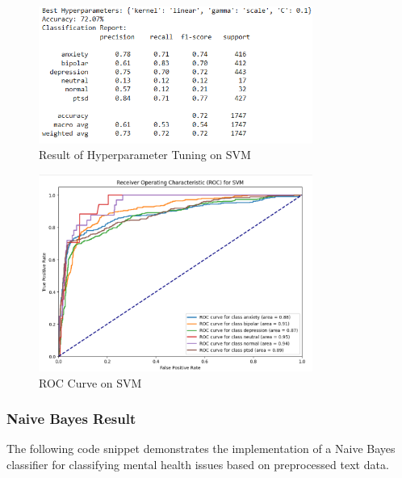 \begin{figure}[h!]  
    \centering
    \includegraphics[width=0.8\textwidth]{Images/Output HPT SVM.png}  
    \caption{Result of Hyperparameter Tuning on SVM}
    \label{HPT SVM}  %
\end{figure}

\begin{figure}[h!]  
    \centering
    \includegraphics[width=0.8\textwidth]{Images/ROC SVM.png}  
    \caption{ROC Curve on SVM}
    \label{ROC SVM}  %
\end{figure}

\pagebreak

\subsubsection{Naive Bayes Result}
\noindent
The following code snippet demonstrates the implementation of a Naive Bayes classifier for classifying mental health issues based on preprocessed text data.

